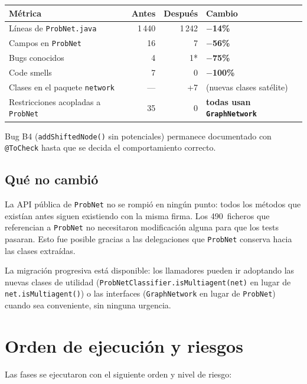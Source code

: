 \documentclass[11pt,a4paper]{article}
\newcommand{\code}[1]{\texttt{#1}}
\newcommand{\good}[1]{\textcolor{codegreen}{\textbf{#1}}}
\begin{document}
\begin{center}
\begin{tabular}{lrrl}
\toprule
\textbf{Métrica} & \textbf{Antes} & \textbf{Después} & \textbf{Cambio} \\
\midrule
Líneas de \code{ProbNet.java}     & 1\,440 & 1\,242 & \good{$-$14\%} \\
Campos en \code{ProbNet}          & 16     & 7      & \good{$-$56\%} \\
Bugs conocidos                    & 4      & 1*     & \good{$-$75\%} \\
Code smells                       & 7      & 0      & \good{$-$100\%} \\
Clases en el paquete \code{network} & ---  & +7     & (nuevas clases satélite) \\
Restricciones acopladas a \code{ProbNet} & 35 & 0  & \good{todas usan \code{GraphNetwork}} \\
\bottomrule
\end{tabular}
\end{center}

{\small * Bug B4 (\code{addShiftedNode()} sin potenciales) permanece documentado
con \code{@ToCheck} hasta que se decida el comportamiento correcto.}

\subsection{Qué no cambió}

La API pública de \code{ProbNet} no se rompió en ningún punto: todos los
métodos que existían antes siguen existiendo con la misma firma.  Los
490~ficheros que referencian a \code{ProbNet} no necesitaron
modificación alguna para que los tests pasaran.  Esto fue posible gracias
a las delegaciones que \code{ProbNet} conserva hacia las clases extraídas.

La migración progresiva está disponible: los llamadores pueden ir
adoptando las nuevas clases de utilidad (\code{ProbNetClassifier.isMultiagent(net)}
en lugar de \code{net.isMultiagent()}) o las interfaces
(\code{GraphNetwork} en lugar de \code{ProbNet}) cuando sea conveniente,
sin ninguna urgencia.

\section{Orden de ejecución y riesgos}

Las fases se ejecutaron con el siguiente orden y nivel de riesgo:
\end{document}
